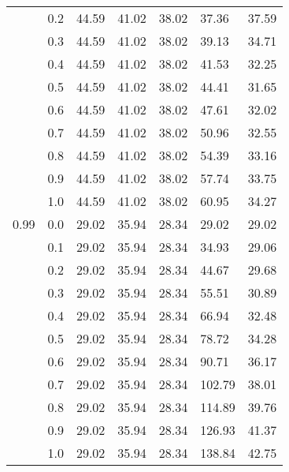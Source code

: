 \begin{longtable}{lp{2cm}|p{2cm}p{2cm}p{2cm}p{2cm}p{2cm}}
     & 0.2 &       44.59 &             41.02 &                38.02 &                37.36 &           37.59 \\
     & 0.3 &       44.59 &             41.02 &                38.02 &                39.13 &           34.71 \\
     & 0.4 &       44.59 &             41.02 &                38.02 &                41.53 &           32.25 \\
     & 0.5 &       44.59 &             41.02 &                38.02 &                44.41 &           31.65 \\
     & 0.6 &       44.59 &             41.02 &                38.02 &                47.61 &           32.02 \\
     & 0.7 &       44.59 &             41.02 &                38.02 &                50.96 &           32.55 \\
     & 0.8 &       44.59 &             41.02 &                38.02 &                54.39 &           33.16 \\
     & 0.9 &       44.59 &             41.02 &                38.02 &                57.74 &           33.75 \\
     & 1.0 &       44.59 &             41.02 &                38.02 &                60.95 &           34.27 \\
0.99 & 0.0 &       29.02 &             35.94 &                28.34 &                29.02 &           29.02 \\
     & 0.1 &       29.02 &             35.94 &                28.34 &                34.93 &           29.06 \\
     & 0.2 &       29.02 &             35.94 &                28.34 &                44.67 &           29.68 \\
     & 0.3 &       29.02 &             35.94 &                28.34 &                55.51 &           30.89 \\
     & 0.4 &       29.02 &             35.94 &                28.34 &                66.94 &           32.48 \\
     & 0.5 &       29.02 &             35.94 &                28.34 &                78.72 &           34.28 \\
     & 0.6 &       29.02 &             35.94 &                28.34 &                90.71 &           36.17 \\
     & 0.7 &       29.02 &             35.94 &                28.34 &               102.79 &           38.01 \\
     & 0.8 &       29.02 &             35.94 &                28.34 &               114.89 &           39.76 \\
     & 0.9 &       29.02 &             35.94 &                28.34 &               126.93 &           41.37 \\
     & 1.0 &       29.02 &             35.94 &                28.34 &               138.84 &           42.75 \\
\end{longtable}
